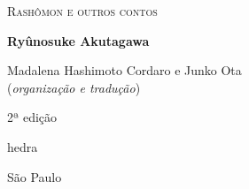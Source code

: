 




\begingroup\thispagestyle{empty}\vspace*{.05\textheight} 

              \formular
              \LARGE
              \noindent
              \textsc{Rashômon e outros contos}
                      
              \bigskip  
              
              \Large
              \noindent
              \textbf{Ryûnosuke Akutagawa}
              \vspace{3.5em}

              \newfontfamily{}
              {\fontsize{30}{40}\selectfont \minion\small\noindent Madalena Hashimoto Cordaro e Junko Ota\\ (\textit{organização e tradução})}\\
              \vspace{3em}

              \noindent
              {\fontsize{30}{40}\selectfont \minion\small\noindent 2ª edição}

              \vfill

              \newfontfamily{}
              {\noindent\fontsize{30}{40}\selectfont \timesnewroman hedra}
              \smallskip

              {\selectfont\minion\small
              \noindent São Paulo \quad\the\year}

\endgroup
\pagebreak
